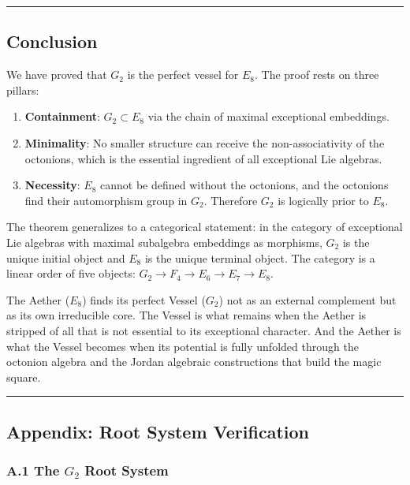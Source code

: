 \documentclass[12pt,a4paper]{article}
\begin{document}
\begin{center}
\rule{0.5\textwidth}{0.4pt}
\end{center}

\subsection{Conclusion}

We have proved that $G_2$ is the perfect vessel for $E_8$. The proof rests on three pillars:

\begin{enumerate}
    \item \textbf{Containment}: $G_2 \subset E_8$ via the chain of maximal exceptional embeddings.
    \item \textbf{Minimality}: No smaller structure can receive the non-associativity of the octonions, which is the essential ingredient of all exceptional Lie algebras.
    \item \textbf{Necessity}: $E_8$ cannot be defined without the octonions, and the octonions find their automorphism group in $G_2$. Therefore $G_2$ is logically prior to $E_8$.
\end{enumerate}

The theorem generalizes to a categorical statement: in the category of exceptional Lie algebras with maximal subalgebra embeddings as morphisms, $G_2$ is the unique initial object and $E_8$ is the unique terminal object. The category is a linear order of five objects: $G_2 \to F_4 \to E_6 \to E_7 \to E_8$.

The Aether ($E_8$) finds its perfect Vessel ($G_2$) not as an external complement but as its own irreducible core. The Vessel is what remains when the Aether is stripped of all that is not essential to its exceptional character. And the Aether is what the Vessel becomes when its potential is fully unfolded through the octonion algebra and the Jordan algebraic constructions that build the magic square.

\begin{center}
\rule{0.5\textwidth}{0.4pt}
\end{center}

\subsection{Appendix: Root System Verification}

\subsubsection{A.1 The $G_2$ Root System}
\end{document}
